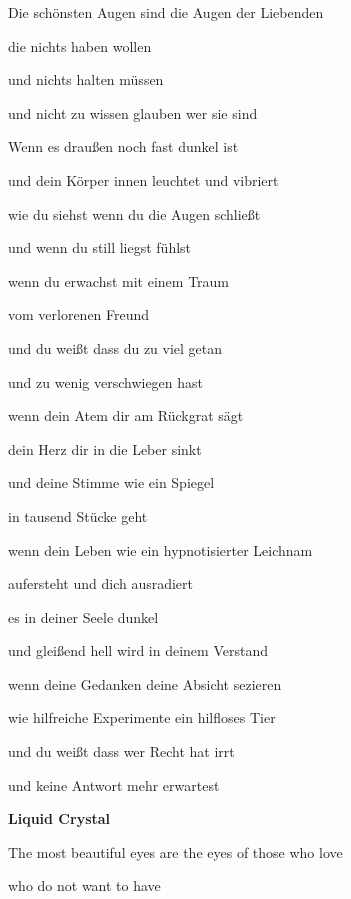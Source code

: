 \documentclass[a4paper]{article}
\begin{document}
\bigskip



\bigskip

Die schönsten Augen sind die Augen der Liebenden

die nichts haben wollen

und nichts halten müssen

und nicht zu wissen glauben wer sie sind


\bigskip

Wenn es draußen noch fast dunkel ist

und dein Körper innen leuchtet und vibriert

wie du siehst wenn du die Augen schließt

und wenn du still liegst fühlst


\bigskip

wenn du erwachst mit einem Traum

vom verlorenen Freund

und du weißt dass du zu viel getan

und zu wenig verschwiegen hast


\bigskip

wenn dein Atem dir am Rückgrat sägt

dein Herz dir in die Leber sinkt

und deine Stimme wie ein Spiegel

in tausend Stücke geht


\bigskip

wenn dein Leben wie ein hypnotisierter Leichnam

aufersteht und dich ausradiert

es in deiner Seele dunkel

und gleißend hell wird in deinem Verstand


\bigskip

wenn deine Gedanken deine Absicht sezieren

wie hilfreiche Experimente ein hilfloses Tier

und du weißt dass wer Recht hat irrt

und keine Antwort mehr erwartest


\bigskip


\bigskip

{\bfseries
Liquid Crystal}


\bigskip

The most beautiful eyes are the eyes of those who love

who do not want to have
\end{document}
